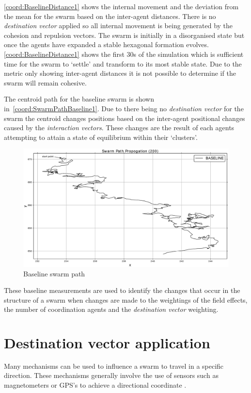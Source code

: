 \autoref{coord:BaselineDistance1} shows the internal movement and the deviation from the mean for the swarm based on the inter-agent distances. There is no \textit{destination vector} applied so all internal movement is being generated by the cohesion and repulsion vectors. The swarm is initially in a disorganised state but once the agents have expanded a stable hexagonal formation evolves. \autoref{coord:BaselineDistance1} shows the first 30s of the simulation which is sufficient time for the swarm to `settle' and transform to its most stable state. Due to the metric only showing inter-agent distances it is not possible to determine if the swarm will remain cohesive.

The centroid path for the baseline swarm is shown in~\autoref{coord:SwarmPathBaseline1}. Due to there being no \textit{destination vector} for the swarm the centroid changes positions based on the inter-agent positional changes caused by the \textit{interaction vectors}. These changes are the result of each agents attempting to attain a state of equilibrium within their `clusters'.

\begin{figure}[H]
\begin{center}
\includegraphics[width=14cm]{CHAPTER-6/figures/SwarmPathBaseline}
\end{center}
\caption{Baseline swarm path\label{coord:SwarmPathBaseline1}}
\end{figure}

These baseline measurements are used to identify the changes that occur in the structure of a swarm when changes are made to the weightings of the field effects, the number of coordination agents and the \textit{destination vector} weighting.

\section{Destination vector application}
Many mechanisms can be used to influence a swarm to travel in a specific direction. These mechanisms generally involve the use of sensors such as magnetometers or GPS's to achieve a directional coordinate \cite{SG:15,TG:12}. 

